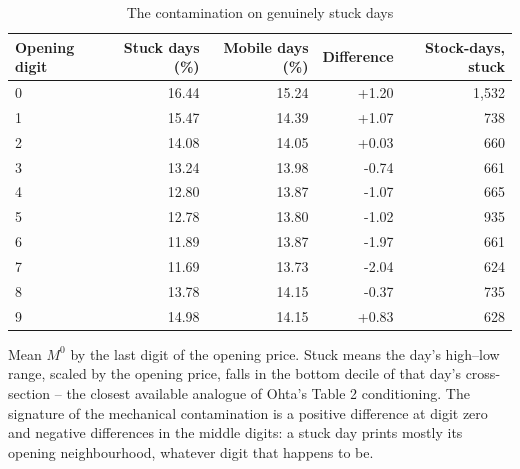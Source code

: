 \begin{table}[htbp]
\centering
\caption{The contamination on genuinely stuck days}
\label{tab:openingstuck}
\small
\begin{threeparttable}
\begin{tabular}{@{}lrrrr@{}}
\toprule
Opening digit & Stuck days (\%) & Mobile days (\%) & Difference & Stock-days, stuck \\
\midrule
0 & 16.44 & 15.24 & +1.20 & 1,532 \\
1 & 15.47 & 14.39 & +1.07 & 738 \\
2 & 14.08 & 14.05 & +0.03 & 660 \\
3 & 13.24 & 13.98 & -0.74 & 661 \\
4 & 12.80 & 13.87 & -1.07 & 665 \\
5 & 12.78 & 13.80 & -1.02 & 935 \\
6 & 11.89 & 13.87 & -1.97 & 661 \\
7 & 11.69 & 13.73 & -2.04 & 624 \\
8 & 13.78 & 14.15 & -0.37 & 735 \\
9 & 14.98 & 14.15 & +0.83 & 628 \\
\bottomrule
\end{tabular}
\begin{tablenotes}[flushleft]\footnotesize
\item Mean $M^{0}$ by the last digit of the opening price. Stuck means the day's high--low range, scaled by the opening price, falls in the bottom decile of that day's cross-section -- the closest available analogue of Ohta's Table 2 conditioning. The signature of the mechanical contamination is a positive difference at digit zero and negative differences in the middle digits: a stuck day prints mostly its opening neighbourhood, whatever digit that happens to be.
\end{tablenotes}
\end{threeparttable}
\end{table}
